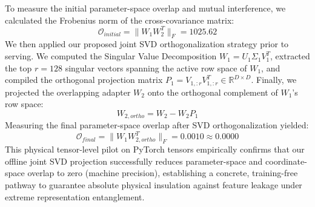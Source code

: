 \documentclass{article}
\theoremstyle{plain}
\theoremstyle{definition}
\theoremstyle{remark}
\begin{document}
To measure the initial parameter-space overlap and mutual interference, we calculated the Frobenius norm of the cross-covariance matrix:
\begin{equation}
  \mathcal{O}_{initial} = \|W_1 W_2^T\|_F = 1025.62
\end{equation}
We then applied our proposed joint SVD orthogonalization strategy prior to serving. We computed the Singular Value Decomposition $W_1 = U_1 \Sigma_1 V_1^T$, extracted the top $r = 128$ singular vectors spanning the active row space of $W_1$, and compiled the orthogonal projection matrix $P_1 = V_{1, :r} V_{1, :r}^T \in \mathbb{R}^{D \times D}$. Finally, we projected the overlapping adapter $W_2$ onto the orthogonal complement of $W_1$'s row space:
\begin{equation}
  W_{2, ortho} = W_2 - W_2 P_1
\end{equation}
Measuring the final parameter-space overlap after SVD orthogonalization yielded:
\begin{equation}
  \mathcal{O}_{final} = \|W_1 W_{2, ortho}^T\|_F = 0.0010 \approx 0.0000
\end{equation}
This physical tensor-level pilot on PyTorch tensors empirically confirms that our offline joint SVD projection successfully reduces parameter-space and coordinate-space overlap to zero (machine precision), establishing a concrete, training-free pathway to guarantee absolute physical insulation against feature leakage under extreme representation entanglement.
\end{document}
